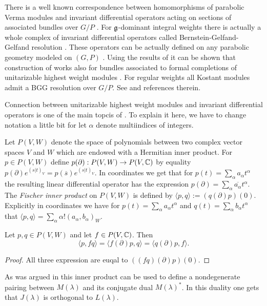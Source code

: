 There is a well known correspondence between homomorphisms of parabolic Verma modules and invariant differential operators acting on sections of associated bundles over $G/P$ \cite{cap_bernstein-gelfand-gelfand_2001}. For $\mathfrak{g}$-dominant integral weights there is actually a whole complex of invariant differential operators called Bernstein-Gelfand-Gelfand resolution \cite{benstein_affine}.  These operators can be actually defined on any parabolic geometry modeled on $(G, P)$ \cite{cap_bernstein-gelfand-gelfand_2001, calderbank_differential_2001}. Using the results of \cite{huang_dirac_2006} it can be shown that construction of \cite{calderbank_differential_2001} works also for bundles associated to formal completions of unitarizable highest weight modules \cite{tucek_yamabe_2012}. For regular weights all Kostant modules admit a BGG resolution over $G/P$. See \cite{enright_diagrams_2014} and references therein. 

Connection between unitarizable highest weight modules and invariant differential operators is one of the main topcis of \cite{davidson_differential_1991}. To explain it here, we have to change notation a little bit for let $\alpha$ denote multiindices of integers.

Let $P(V,W)$ denote the space of polynomials between two complex vector spaces $V$ and $W$ which are endowed with a Hermitian inner product. For $p\in P(V,W)$ define $p(\partial):P(V,W)\to P(V,\mathbb{C})$ by equality $p(\partial) e^{(s|t)_V} = p(\overline{s})e^{(s|t)_V}$. In coordinates we get that for $p(t) = \sum_{\alpha} a_{\alpha} t^{\alpha}$ the resulting linear differential operator has the expression $p(\partial)= \sum_{\alpha} \overline{a_{\alpha}} t^{\alpha}$. The \emph{Fischer inner product} on $P(V,W)$ is defined by $\langle p,q\rangle := (q(\partial)p)(0)$. Explicitly in coordinates we have for  $p(t) = \sum_{\alpha} a_{\alpha} t^{\alpha}$ and  $q(t) = \sum_{\alpha} b_{\alpha} t^{\alpha}$ that $\langle p,q\rangle = \sum_{\alpha} \alpha! (a_{\alpha},b_{\alpha})_W$.

\begin{lemma}
 Let $p,q\in P(V,W)$ and let $f\in P(V,\mathbb{C})$. Then
 \[
  \langle p,fq\rangle = \langle f(\partial)p, q \rangle = \langle q(\partial)p,f \rangle.
 \]
\end{lemma}
\begin{proof}
 All three expression are euqal to $((fq)(\partial)p)(0)$.
\end{proof}

As was argued in \cite{davidson_differential_1991} this inner product can be used to define a nondegenerate pairing between $M(\lambda)$ and its conjugate dual $M(\lambda)^*$. In this duality one gets that $J(\lambda)$ is orthogonal to $L(\lambda)$.

